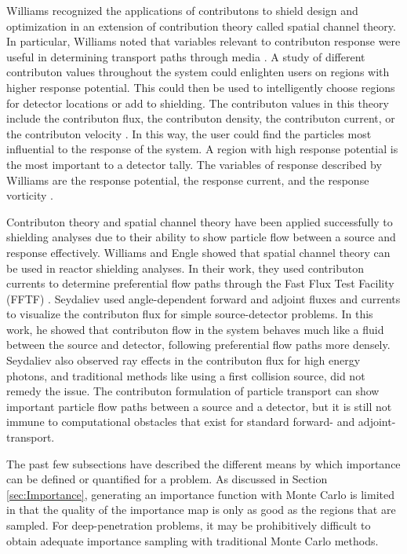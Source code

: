 Williams recognized the applications of contributons to
shield design and optimization in an extension of contribution theory called
spatial channel theory. In particular, Williams noted that variables
relevant to contributon response were useful in determining transport paths
through media \cite{williams_contributon_study, williams_SCC_shielding}. A study
of different contributon values throughout the system could enlighten users on
regions with higher response potential. This could then be used to intelligently
choose regions for detector locations or add to shielding.
The contributon values in this theory include the contributon flux, the
contributon density, the contributon current, or the contributon velocity
\cite{williams_relations_1977}.
In this way, the
user could find the particles most influential to the response of the system. A
region with high response potential is the most important to a detector tally. The
variables of response described by Williams are the response potential, the
response current, and the response vorticity \cite{williams_contributorn_1992}.

Contributon theory and spatial channel theory have been applied successfully to
shielding analyses \cite{seydaliev_contributon_2008, williams_SCC_shielding} due
to their ability to show particle flow between a source and response effectively.
Williams and Engle showed that
spatial channel theory can be used in reactor shielding analyses.
In their work, they used
contributon currents to determine preferential flow paths through the Fast Flux
Test Facility (FFTF) \cite{williams_SCC_shielding}.
Seydaliev \cite{seydaliev_contributon_2008} used angle-dependent forward and
adjoint
fluxes and currents to visualize the contributon flux for
simple source-detector problems. In this work, he showed that contributon flow
in the system behaves much like a fluid between the source and detector,
following preferential flow paths more densely.
Seydaliev also observed ray effects in the
contributon flux for high energy photons, and traditional methods like using a
first collision source, did not remedy the issue. The contributon formulation of
particle transport can show important particle flow paths between a source and a
detector, but it is still not immune to computational obstacles that exist for
standard forward- and adjoint- transport.

The past few subsections have described the different means by which importance
can be defined or quantified for a problem.
As discussed in Section \ref{sec:Importance}, generating an importance function
with Monte Carlo is limited in that the quality of the importance map is only as
good as the regions that are sampled. For deep-penetration problems, it may be
prohibitively difficult to obtain adequate importance sampling with traditional
Monte Carlo methods.

